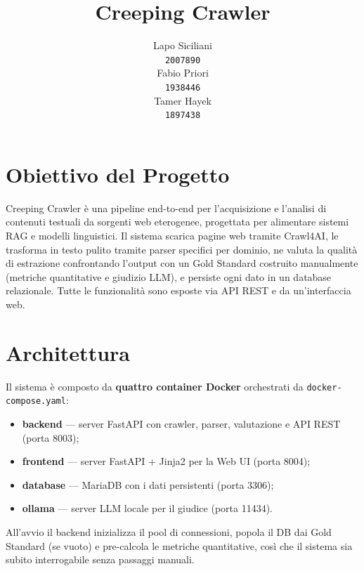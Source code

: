 \documentclass[11pt]{article}
\title{Creeping Crawler}
\author{Lapo Siciliani \\
  \texttt{2007890} \\\And
  Fabio Priori \\
  \texttt{1938446} \\\And
  Tamer Hayek \\
  \texttt{1897438} \\}
\begin{document}
\maketitle


\section{Obiettivo del Progetto}

Creeping Crawler è una pipeline end-to-end per l'acquisizione e l'analisi di contenuti testuali da sorgenti web eterogenee, progettata per alimentare sistemi RAG e modelli linguistici. Il sistema scarica pagine web tramite Crawl4AI, le trasforma in testo pulito tramite parser specifici per dominio, ne valuta la qualità di estrazione confrontando l'output con un Gold Standard costruito manualmente (metriche quantitative e giudizio LLM), e persiste ogni dato in un database relazionale. Tutte le funzionalità sono esposte via API REST e da un'interfaccia web.


\section{Architettura}

Il sistema è composto da \textbf{quattro container Docker} orchestrati da \texttt{docker-compose.yaml}:

\begin{itemize}
  \item \textbf{backend} — server FastAPI con crawler, parser, valutazione e API REST (porta 8003);
  \item \textbf{frontend} — server FastAPI + Jinja2 per la Web UI (porta 8004);
  \item \textbf{database} — MariaDB con i dati persistenti (porta 3306);
  \item \textbf{ollama} — server LLM locale per il giudice (porta 11434).
\end{itemize}

All'avvio il backend inizializza il pool di connessioni, popola il DB dai Gold Standard (se vuoto) e pre-calcola le metriche quantitative, così che il sistema sia subito interrogabile senza passaggi manuali.

\end{document}
